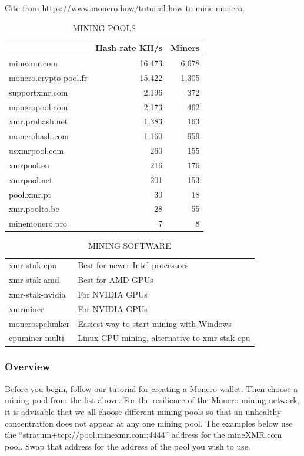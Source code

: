 	Cite from \url{https://www.monero.how/tutorial-how-to-mine-monero}.\par
	\begin{table}[H]
		\centering
		\caption{MINING POOLS}
		\begin{tabular}{lrr}
			\hline
				&Hash rate KH/s	&Miners \\
			\hline
			minexmr.com	&16,473	&6,678 \\
			monero.crypto-pool.fr	&15,422	&1,305 \\
			supportxmr.com	&2,196	&372 \\
			moneropool.com	&2,173	&462 \\
			xmr.prohash.net	&1,383	&163 \\
			monerohash.com	&1,160	&959 \\
			usxmrpool.com	&260	&155 \\
			xmrpool.eu	&216	&176 \\
			xmrpool.net	&201	&153 \\
			pool.xmr.pt	&30	&18 \\
			xmr.poolto.be	&28	&55 \\
			minemonero.pro	&7	&8 \\
			\hline
		\end{tabular}
	\end{table}
	\begin{table}[H]
		\centering
		\caption{MINING SOFTWARE}
		\begin{tabular}{ll}
			\hline
			xmr-stak-cpu   &Best for newer Intel processors \\
			xmr-stak-amd   &Best for AMD GPUs \\
			xmr-stak-nvidia   &For NVIDIA GPUs \\
			xmrminer   &For NVIDIA GPUs \\
			monerospelunker   &Easiest way to start mining with Windows \\
			cpuminer-multi   &Linux CPU mining, alternative to xmr-stak-cpu \\
			\hline
		\end{tabular}
	\end{table}
\subsubsection{Overview}
	Before you begin, follow our tutorial for \href{https://www.monero.how/tutorial-how-to-create-a-command-line-monero-wallet}{creating a Monero wallet}. Then choose a mining pool from the list above. For the resilience of the Monero mining network, it is advisable that we all choose different mining pools so that an unhealthy concentration does not appear at any one mining pool. The examples below use the ``stratum+tcp://pool.minexmr.com:4444'' address for the mineXMR.com pool. Swap that address for the address of the pool you wish to use.
